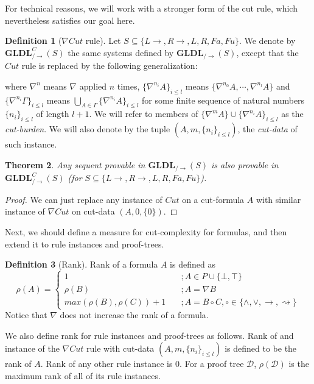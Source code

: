 \documentclass[12pt,a4paper]{article}
\theoremstyle{plain}
\newtheorem{thm}{Theorem}[section]
\theoremstyle{definition}
\newtheorem{dfn}[thm]{Definition}
\begin{document}
For technical reasons, we will work with a stronger form of the cut rule, which nevertheless satisfies our goal here.
\begin{dfn}[$\nabla Cut$ rule]\label{def:n-cut} Let $S \subseteq \{L\rightarrow, R\rightarrow, L, R, Fa, Fu\}$. We denote by $\mathbf{GLDL}^C_{/\rightarrow}(S)$ the same systems defined by $\mathbf{GLDL}_{/\rightarrow}(S)$, except that the $Cut$ rule is replaced by the following generalization:
\begin{prooftree}
\end{prooftree}
where $\nabla^n$ means $\nabla$ applied $n$ times, $\{\nabla^{n_i} A\}_{i \leq l}$ means $\{\nabla^{n_0} A,\dotsb, \nabla^{n_l} A\}$ and $\{\nabla^{n_i} \Gamma\}_{i \leq l}$ means $\bigcup_{A \in \Gamma} \{\nabla^{n_i} A\}_{i \leq l}$ for some finite sequence of natural numbers $\{n_i\}_{i \leq l}$ of length $l+1$.
We will refer to members of $\{\nabla^m A\} \cup \{\nabla^{n_i} A\}_{i \leq l}$ as the \emph{cut-burden}. We will also denote by the tuple $(A, m, \{n_i\}_{i \leq l})$, the \emph{cut-data} of such instance.
\end{dfn}

\begin{thm}\label{cor:mc-riddance} Any sequent provable in $\mathbf{GLDL}_{/\rightarrow}(S)$ is also provable in $\mathbf{GLDL}^C_{/\rightarrow}(S)$ (for $S \subseteq \{L\rightarrow, R\rightarrow, L, R, Fa, Fu\}$).
\end{thm}
\begin{proof}
	We can just replace any instance of $Cut$ on a cut-formula $A$ with similar instance of $\nabla Cut$ on cut-data $(A, 0, \{0\})$.
\end{proof}

Next, we should define a measure for cut-complexity for formulas, and then extend it to rule instances and proof-trees.

\begin{dfn}[Rank]
	Rank of a formula $A$ is defined as
	\[ \rho(A) = \begin{cases}
	1 & \quad ; A \in P \cup \{ \bot, \top \} \\
	\rho(B) & \quad ; A = \nabla B \\
	max(\rho(B), \rho(C)) + 1 & \quad ; A = B \circ C, \circ \in \{ \land, \lor, \rightarrow, \rightsquigarrow \}
	\end{cases} \]
	Notice that $\nabla$ does not increase the rank of a formula.
	
	We also define rank for rule instances and proof-trees as follows. Rank of and instance of the $\nabla Cut$ rule with cut-data $(A, m, \{n_i\}_{i \leq l})$ is defined to be the rank of $A$. Rank of any other rule instance is $0$.
	For a proof tree $\mathcal{D}$, $\rho(\mathcal{D})$ is the maximum rank of all of its rule instances.
\end{dfn}
\end{document}
